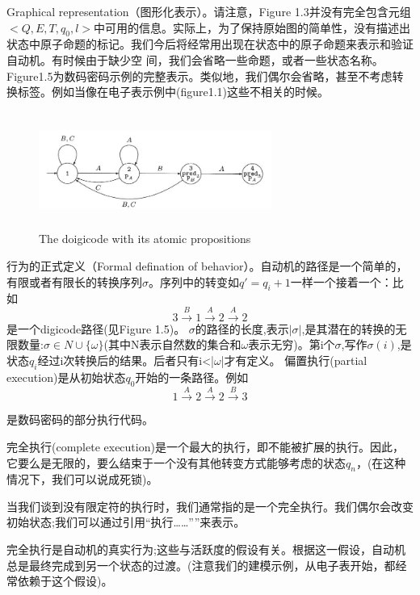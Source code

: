 \documentclass{book}
\begin{document}
    Graphical representation（图形化表示）。请注意，Figure 1.3并没有完全包含元组$<Q,E,T,q_0,l>$中可用的信息。实际上，为了保持原始图的简单性，没有描述出状态中原子命题的标记。我们今后将经常用出现在状态中的原子命题来表示和验证自动机。有时候由于缺少空
    间，我们会省略一些命题，或者一些状态名称。Figure1.5为数码密码示例的完整表示。类似地，我们偶尔会省略，甚至不考虑转换标签。例如当像在电子表示例中(figure1.1)这些不相关的时候。
    \begin{figure}
    \centering
    \includegraphics[height=1.5in,width=3.0in]{1_5.jpg}
    \caption{The doigicode with its atomic propositions}
    \end{figure}

    行为的正式定义（Formal defination of behavior）。自动机的路径是一个简单的，有限或者有限长的转换序列${\sigma}$。序列中的转变如$q'=q_i+1$一样一个接着一个：比如
    \begin{equation*}
    3\xrightarrow{B} 1\xrightarrow{A} 2\xrightarrow{A} 2
    \end{equation*}是一个digicode路径(见Figure 1.5)。
    $\sigma$的路径的长度,表示$|\sigma|$,是其潜在的转换的无限数量:$\sigma\in N \cup\{\omega\}$(其中N表示自然数的集合和$\omega$表示无穷)。第i个$\sigma$,写作$\sigma(i)$,是状态$q_i$经过i次转换后的结果。后者只有i<|$\omega$|才有定义。
    偏置执行(partial execution)是从初始状态$q_0$开始的一条路径。例如
    \begin{equation*}
    1\xrightarrow{A} 2\xrightarrow{A} 2\xrightarrow{B} 3
    \end{equation*}

是数码密码的部分执行代码。

    完全执行(complete execution)是一个最大的执行，即不能被扩展的执行。因此，它要么是无限的，要么结束于一个没有其他转变方式能够考虑的状态$q_n$，(在这种情况下，我们可以说成死锁)。

    当我们谈到没有限定符的执行时，我们通常指的是一个完全执行。我们偶尔会改变初始状态;我们可以通过引用“执行……””来表示。

    完全执行是自动机的真实行为;这些与活跃度的假设有关。根据这一假设，自动机总是最终完成到另一个状态的过渡。(注意我们的建模示例，从电子表开始，都经常依赖于这个假设)。
\end{document}
